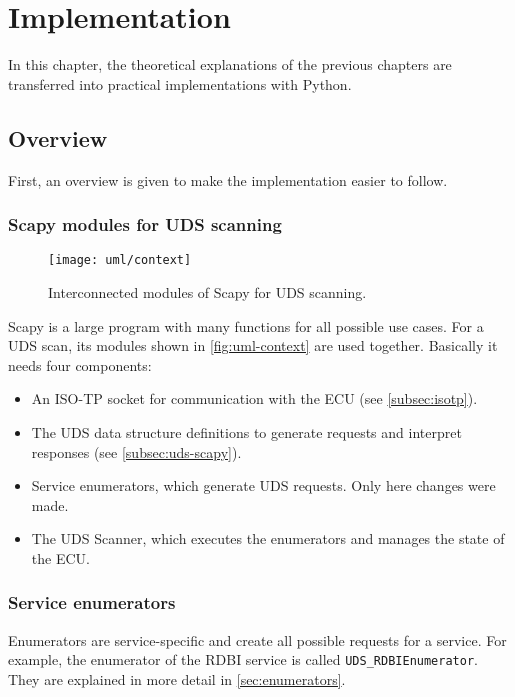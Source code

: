 \chapter{Implementation}

In this chapter, the theoretical explanations of the previous chapters are transferred into practical implementations with Python.

\section{Overview}

First, an overview is given to make the implementation easier to follow.

\subsection{Scapy modules for UDS scanning}

\begin{figure}[htb]
    \centering
    \texttt{[image: uml/context]}
    \caption{Interconnected modules of Scapy for UDS scanning.}
    \label{fig:uml-context}
\end{figure}

Scapy is a large program with many functions for all possible use cases. For a UDS scan, its modules shown in \autoref{fig:uml-context} are used together. Basically it needs four components:

\begin{itemize}
    \item An ISO-TP socket for communication with the ECU (see \autoref{subsec:isotp}).
    \item The UDS data structure definitions to generate requests and interpret responses (see \autoref{subsec:uds-scapy}).
    \item Service enumerators, which generate UDS requests. Only here changes were made.
    \item The UDS Scanner, which executes the enumerators and manages the state of the ECU.
\end{itemize}


\subsection{Service enumerators}

Enumerators are service-specific and create all possible requests for a service. For example, the enumerator of the RDBI service is called \texttt{UDS_RDBIEnumerator}. They are explained in more detail in \autoref{sec:enumerators}.

